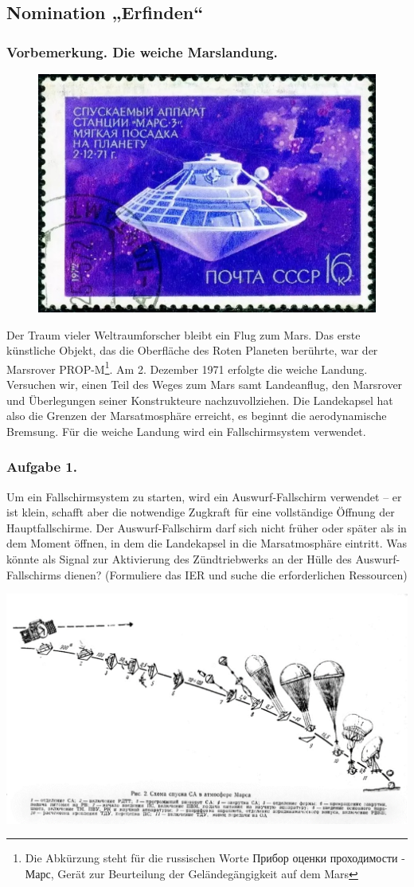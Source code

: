 \documentclass[11pt,a4paper]{article}
\begin{document}
\subsection{Nomination „Erfinden“}

\subsubsection*{Vorbemerkung. Die weiche Marslandung.}

\begin{figure}\vspace*{-1em}\centering
\includegraphics[width=.25\textwidth]{jEMlaM.jpg}
\end{figure}
Der Traum vieler Weltraumforscher bleibt ein Flug zum Mars. Das erste
künstliche Objekt, das die Oberfläche des Roten Planeten berührte, war der
Marsrover PROP-M\footnote{Die Abkürzung steht für die russischen Worte
  \foreignlanguage{russian}{Прибор оценки проходимости - Марс}, Gerät zur
  Beurteilung der Geländegängigkeit auf dem Mars}. Am 2. Dezember 1971
erfolgte die weiche Landung.  Versuchen wir, einen Teil des Weges zum Mars
samt Landeanflug, den Marsrover und Überlegungen seiner Konstrukteure
nachzuvollziehen. Die Landekapsel hat also die Grenzen der Marsatmosphäre
erreicht, es beginnt die aerodynamische Bremsung.  Für die weiche Landung wird
ein Fallschirmsystem verwendet.

\subsubsection*{Aufgabe 1.}
Um ein Fallschirmsystem zu starten, wird ein Auswurf-Fallschirm verwendet --
er ist klein, schafft aber die notwendige Zugkraft für eine vollständige
Öffnung der Hauptfallschirme. Der Auswurf-Fallschirm darf sich nicht früher
oder später als in dem Moment öffnen, in dem die Landekapsel in die
Marsatmosphäre eintritt. Was könnte als Signal zur Aktivierung des
Zündtriebwerks an der Hülle des Auswurf-Fallschirms dienen?  (Formuliere das
IER und suche die erforderlichen Ressourcen)
\begin{center}
\includegraphics[width=.95\textwidth]{12uaYg.png}
\end{center}
\end{document}
